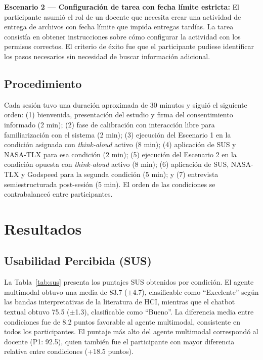 \documentclass[conference]{IEEEtran}
\begin{document}
\textbf{Escenario 2 --- Configuración de tarea con fecha límite estricta:} El participante asumió el rol de un docente que necesita crear una actividad de entrega de archivos con fecha límite que impida entregas tardías. La tarea consistía en obtener instrucciones sobre cómo configurar la actividad con los permisos correctos. El criterio de éxito fue que el participante pudiese identificar los pasos necesarios sin necesidad de buscar información adicional.

\subsection{Procedimiento}
Cada sesión tuvo una duración aproximada de 30 minutos y siguió el siguiente orden: (1) bienvenida, presentación del estudio y firma del consentimiento informado (2 min); (2) fase de calibración con interacción libre para familiarización con el sistema (2 min); (3) ejecución del Escenario 1 en la condición asignada con \textit{think-aloud} activo (8 min); (4) aplicación de SUS y NASA-TLX para esa condición (2 min); (5) ejecución del Escenario 2 en la condición opuesta con \textit{think-aloud} activo (8 min); (6) aplicación de SUS, NASA-TLX y Godspeed para la segunda condición (5 min); y (7) entrevista semiestructurada post-sesión (5 min). El orden de las condiciones se contrabalanceó entre participantes.

\section{Resultados}
\subsection{Usabilidad Percibida (SUS)}
La Tabla~\ref{tab:sus} presenta los puntajes SUS obtenidos por condición. El agente multimodal obtuvo una media de 83.7 ($\pm$4.7), clasificable como ``Excelente'' según las bandas interpretativas de la literatura de HCI, mientras que el chatbot textual obtuvo 75.5 ($\pm$1.3), clasificable como ``Bueno''. La diferencia media entre condiciones fue de 8.2 puntos favorable al agente multimodal, consistente en todos los participantes. El puntaje m\'as alto del agente multimodal correspondó al docente (P1: 92.5), quien también fue el participante con mayor diferencia relativa entre condiciones (+18.5 puntos).
\end{document}
